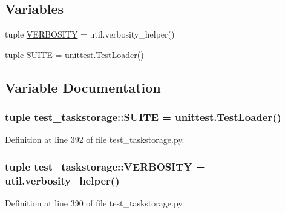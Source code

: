 \subsection*{\-Variables}
\begin{DoxyCompactItemize}
\item 
tuple \hyperlink{namespacetest__taskstorage_a69cba620852c9fdb46228803bc53b78e}{\-V\-E\-R\-B\-O\-S\-I\-T\-Y} = util.\-verbosity\-\_\-helper()
\item 
tuple \hyperlink{namespacetest__taskstorage_a029a13f3fb7328219a635ba36db80686}{\-S\-U\-I\-T\-E} = unittest.\-Test\-Loader()
\end{DoxyCompactItemize}


\subsection{\-Variable \-Documentation}
\hypertarget{namespacetest__taskstorage_a029a13f3fb7328219a635ba36db80686}{
\subsubsection[{\-S\-U\-I\-T\-E}]{\setlength{\rightskip}{0pt plus 5cm}tuple {\bf test\-\_\-taskstorage\-::\-S\-U\-I\-T\-E} = unittest.\-Test\-Loader()}}
\label{namespacetest__taskstorage_a029a13f3fb7328219a635ba36db80686}


\-Definition at line 392 of file test\-\_\-taskstorage.\-py.

\hypertarget{namespacetest__taskstorage_a69cba620852c9fdb46228803bc53b78e}{
\subsubsection[{\-V\-E\-R\-B\-O\-S\-I\-T\-Y}]{\setlength{\rightskip}{0pt plus 5cm}tuple {\bf test\-\_\-taskstorage\-::\-V\-E\-R\-B\-O\-S\-I\-T\-Y} = util.\-verbosity\-\_\-helper()}}
\label{namespacetest__taskstorage_a69cba620852c9fdb46228803bc53b78e}


\-Definition at line 390 of file test\-\_\-taskstorage.\-py.

